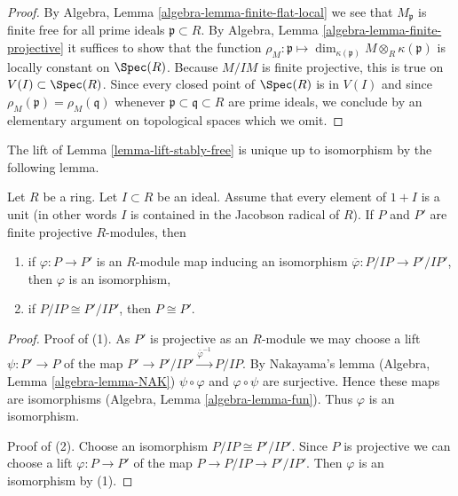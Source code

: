 \begin{proof}
By Algebra, Lemma \ref{algebra-lemma-finite-flat-local}
we see that $M_\mathfrak p$ is finite free for all prime ideals
$\mathfrak p \subset R$.
By
Algebra, Lemma \ref{algebra-lemma-finite-projective}
it suffices to show that the function $\rho_M : \mathfrak p \mapsto
\dim_{\kappa(\mathfrak p)} M \otimes_R \kappa(\mathfrak p)$
is locally constant on $\Spec(R)$. Because $M/IM$ is finite projective, this
is true on $V(I) \subset \Spec(R)$. Since every closed point
of $\Spec(R)$ is in $V(I)$ and since
$\rho_M(\mathfrak p) = \rho_M(\mathfrak q)$
whenever $\mathfrak p \subset \mathfrak q \subset R$
are prime ideals, we conclude by
an elementary argument on topological spaces which we omit.
\end{proof}

\noindent
The lift of Lemma \ref{lemma-lift-stably-free}
is unique up to isomorphism by the following lemma.

\begin{lemma}
\label{lemma-isomorphic-finite-projective-lifts}
Let $R$ be a ring. Let $I \subset R$ be an ideal. Assume that
every element of $1 + I$ is a unit (in other words $I$ is contained
in the Jacobson radical of $R$). If $P$ and $P'$ are finite
projective $R$-modules, then
\begin{enumerate}
\item if $\varphi : P \to P'$ is an $R$-module map inducing an
isomorphism $\overline{\varphi} : P/IP \to P'/IP'$, then $\varphi$
is an isomorphism,
\item if $P/IP \cong P'/IP'$, then $P \cong P'$.
\end{enumerate}
\end{lemma}

\begin{proof}
Proof of (1). As $P'$ is projective as an $R$-module we may
choose a lift $\psi : P' \to P$ of the map
$P' \to P'/IP' \xrightarrow{\overline{\varphi}^{-1}} P/IP$.
By Nakayama's lemma (Algebra, Lemma \ref{algebra-lemma-NAK})
$\psi \circ \varphi$ and $\varphi \circ \psi$ are surjective.
Hence these maps are isomorphisms (Algebra, Lemma \ref{algebra-lemma-fun}).
Thus $\varphi$ is an isomorphism.

\medskip\noindent
Proof of (2). Choose an isomorphism $P/IP \cong P'/IP'$.
Since $P$ is projective we can choose a lift $\varphi : P \to P'$ of the map
$P \to P/IP \to P'/IP'$. Then $\varphi$ is an isomorphism by (1).
\end{proof}




